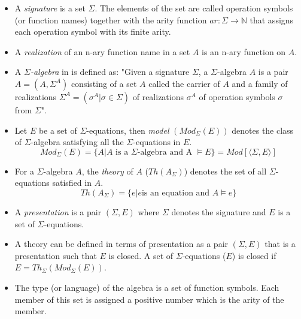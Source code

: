 \begin{itemize}

    \item A \textit{signature} is a set $\Sigma$. The elements of the set are
    called operation symbols (or function names) together with the arity
    function $ar: \Sigma \rightarrow \mathbb{N} $ that assigns each operation symbol with
    its finite arity.

    \item A \textit{realization} of an n-ary function name in a set $A$ is an
    n-ary function on $A$. 

    \item A \emph{$\Sigma$-algebra} in \cite{wechler2012universal} is defined
    as: "Given a signature $\Sigma$, a $\Sigma$-algebra $A$ is a pair $A =
    (A,\Sigma^{A})$ consisting of a set $A$ called the carrier of $A$ and a
    family of realizations $\Sigma^{A} = (\sigma^{A}|\sigma \in \Sigma)$ of
    realizations $\sigma^{A}$ of operation symbols $\sigma$ from $\Sigma$".

    \item Let $E$ be a set of $\Sigma$-equations, then \emph{model} $(Mod_\Sigma(E))$
    denotes the class of $\Sigma$-algebra satisfying all the $\Sigma$-equations
    in $E$.
    \[Mod_\Sigma(E) = \{ A | A \text{ is a } \Sigma\text{-algebra} \text{ and A
    } \models E \} = Mod[⟨\Sigma,E⟩]\]

    \item For a $\Sigma$-algebra $A$, the \emph{theory} of $A$ ($Th(A_\Sigma)$)
    denotes the set of all $\Sigma$-equations satisfied in $A$. \[Th(A_\Sigma) =
    \{ e | e \text{is an equation and }A \models e \}\]

    \item A \emph{presentation} is a pair $(\Sigma,E)$ where $\Sigma$ denotes
    the signature and $E$ is a set of $\Sigma$-equations.
    
    \item A theory can be defined in terms of presentation as a pair $(\Sigma,
    E)$ that is a presentation such that $E$ is closed. A set of
    $\Sigma$-equations ($E$) is closed if $E = Th_\Sigma(Mod_\Sigma(E))$.

    \item The type (or language) of the algebra is a set of function symbols.
    Each member of this set is assigned a positive number which is the arity of
    the member.
\end{itemize}

